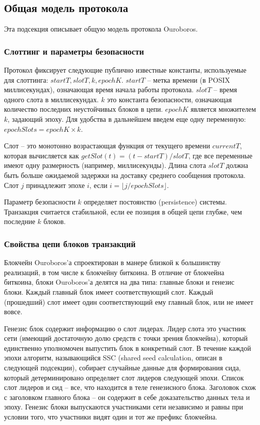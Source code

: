 \documentclass[specification,annotation]{itmo-student-thesis}
\begin{document}
\subsection{Общая модель протокола}

Эта подсекция описывает общую модель протокола Ouroboros.

\subsubsection{Слоттинг и параметры безопасности}

Протокол фиксирует следующие публично известные константы,
используемые для слоттинга: $startT, slotT, k, epochK$. $startT$ --
метка времени (в POSIX миллисекундах), означающая время начала работы
протокола. $slotT$ -- время одного слота в миллисекундах. $k$ это
константа безопасности, означающая количество последних неустойчивых
блоков в цепи. $epochK$ является множителем $k$, задающий эпоху. Для
удобства в дальнейшем введем еще одну переменную: $epochSlots = epochK
\times k$.

Слот -- это монотонно возрастающая функция от текущего времени
$currentT$, которая вычисляется как $getSlot(t) = (t - startT) /
slotT$, где все переменные имеют одну размерность (например,
миллисекунды). Длина слота $slotT$ должна быть больше ожидаемой
задержки на доставку среднего сообщения протокола.  Слот $j$
принадлежит эпохе $i$, если $i = \lfloor j / epochSlots \rfloor$.

Параметр безопасности $k$ определяет постоянство (persistence)
системы. Транзакция считается стабильной, если ее позиция в общей цепи
глубже, чем последние $k$ блоков.

\subsubsection{Свойства цепи блоков транзакций}

Блокчейн Ouroboros'а спроектирован в манере близкой к большинству
реализаций, в том числе к блокчейну биткоина. В отличие от
блокчейна биткоина, блоки Ouroboros'а делятся на два типа: главные
блоки и генезис блоки. Каждый главный блок имеет соответствующий
слот. Каждый (прошедший) слот имеет один соответствующий ему главный
блок, или не имеет вовсе.

Генезис блок содержит информацию о слот лидерах. Лидер слота это
участник сети (имеющий достаточную долю средств с точки зрения
блокчейна), который единственно уполномочен выпустить блок в
конкретный слот. В течение каждой эпохи алгоритм, называющийся SSC
(shared seed calculation, описан в следующей подсекции), собирает
случайные данные для формирования сида, который детерминировано
определяет слот лидеров следующей эпохи. Список слот лидеров и сид --
все, что находится в теле генезисного блока. Заголовок схож с
заголовком главного блока -- он содержит в себе доказательство данных
тела и эпоху. Генезис блоки выпускаются участниками сети независимо и
равны при условии того, что участники видят один и тот же префикс
блокчейна.
\end{document}
